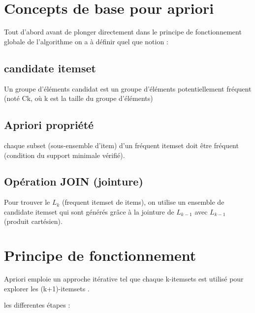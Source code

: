\documentclass[12pt,a4paper,oneside]{book}
\begin{document}
\section{Concepts de base pour apriori}
Tout d'abord avant de plonger directement dans le principe de fonctionnement globale de l'algorithme on a à définir quel que notion :

\subsection*{candidate itemset}     
Un groupe d'éléments candidat est un groupe d'éléments potentiellement fréquent (noté Ck, où k est la taille du groupe d'éléments)
\subsection*{Apriori propriété }
chaque subset (sous-ensemble d'item) d'un fréquent itemset doit être fréquent (condition du support minimale vérifié).
\subsection*{Opération JOIN (jointure)}
Pour trouver le $L_{k}$ (frequent itemset de items), on utilise  un ensemble de candidate itemset qui sont générés grâce à la jointure de $L_{k-1}$ avec $L_{k-1}$ (produit cartésien).

\newpage

\section{Principe de fonctionnement}
Apriori emploie un approche itérative  tel que chaque k-itemsets est utilisé pour explorer les (k+1)-itemsets .

les differentes étapes :
\end{document}
